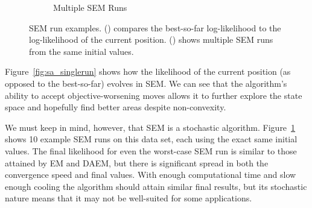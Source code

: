 \documentclass{article}
\theoremstyle{definition}
\theoremstyle{algodesc}
\begin{document}
\begin{figure}[htb]
\begin{subfigure}[t]{.45\linewidth}
    \caption{Multiple SEM Runs} \label{fig:sa_multrun}
  \end{subfigure}
  \caption{SEM run examples. () compares the best-so-far log-likelihood to the log-likelihood of the current position. () shows multiple SEM runs from the same initial values.}
  \label{fig:sa}
\end{figure}

Figure~\ref{fig:sa_singlerun} shows how the likelihood of the current position (as opposed to the best-so-far) evolves in SEM. We can see that the algorithm's ability to accept objective-worsening moves allows it to further explore the state space and hopefully find better areas despite non-convexity.

We must keep in mind, however, that SEM is a stochastic algorithm. Figure~\ref{fig:sa_multrun} shows 10 example SEM runs on this data set, each using the exact same initial values. The final likelihood for even the worst-case SEM run is similar to those attained by EM and DAEM, but there is significant spread in both the convergence speed and final values. With enough computational time and slow enough cooling the algorithm should attain similar final results, but its stochastic nature means that it may not be well-suited for some applications.
\end{document}

